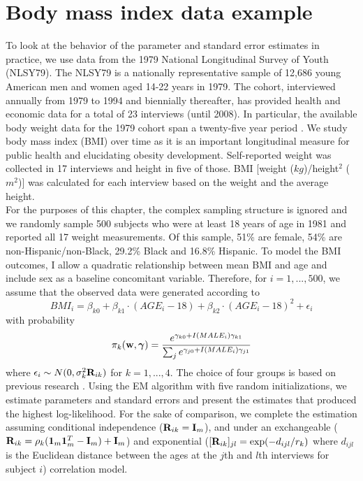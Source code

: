 \section{Body mass index data example} \label{chp2:sec:data}
To look at the behavior of the parameter and standard error estimates in practice, we use data from the 1979 National Longitudinal Survey of Youth (NLSY79). The NLSY79 is a nationally representative sample of 12,686 young American men and women aged 14-22 years in 1979. The cohort, interviewed annually from 1979 to 1994 and biennially thereafter, has provided health and economic data for a total of 23 interviews (until 2008).  In particular, the available body weight data for the 1979 cohort span a twenty-five year period \cite{ostbye2011}. We study body mass index (BMI) over time as it is an important longitudinal measure for public health and elucidating obesity development.  Self-reported weight was collected in 17 interviews and height in five of those. BMI [weight ($kg$)/height$^{2}$ ($m^{2}$)] was calculated for each interview based on the weight and the average height.\\

For the purposes of this chapter, the complex sampling structure is ignored and we randomly sample 500 subjects who were at least 18 years of age in 1981 and reported all 17 weight measurements. Of this sample, 51\% are female, 54\% are non-Hispanic/non-Black, 29.2\% Black and 16.8\% Hispanic. To model the BMI outcomes, I allow a quadratic relationship between mean BMI and age and include sex as a baseline concomitant variable. Therefore, for $i=1,...,500$, we assume that the observed data were generated according to
$$BMI_{i}=\beta_{k0}+\beta_{k1}\cdot (AGE_{i}-18)+\beta_{k2}\cdot (AGE_{i}-18)^{2}+\epsilon_{i}$$
with probability
$$\pi_{k}(\mathbf w,\boldsymbol\gamma)=\frac{e^{\gamma_{k0}+I(MALE_{i})\gamma_{k1}}}{\sum_{j}e^{\gamma_{j0}+I(MALE_{i})\gamma_{j1}}}$$
where $\epsilon_{i}\sim N(0,\sigma_{k}^{2}\mathbf R_{ik})$
for $k=1,...,4$. The choice of four groups is based on previous research \cite{ostbye2011}. Using the EM algorithm with five random initializations, we estimate parameters and standard errors and present the estimates that produced the highest log-likelihood. For the sake of comparison, we complete the estimation assuming conditional independence ($\mathbf R_{ik}  = \mathbf I_m$), and under an exchangeable ($\mathbf R_{ik} = \rho_k(\mathbf 1_m\mathbf 1_{m}^{T} - \mathbf I_m)+\mathbf I_m$) and exponential ($[\mathbf R_{ik}]_{jl} = \exp(-d_{ijl}/r_k)$ where $d_{ijl}$ is the Euclidean distance between the ages at the $j$th and $l$th interviews for subject $i$) correlation model.
